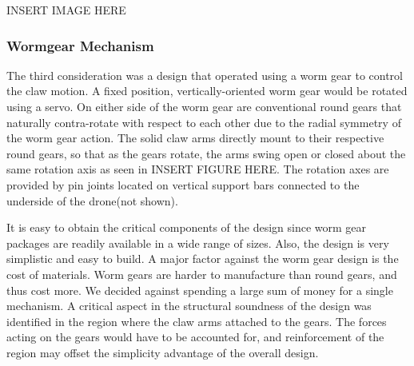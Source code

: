 			INSERT IMAGE HERE

		\subsubsection{Wormgear Mechanism}
			The third consideration was a design that operated using a worm gear to control the claw motion. A fixed position, vertically-oriented worm gear would be rotated using a servo. On either side of the worm gear are conventional round gears that naturally contra-rotate with respect to each other due to the radial symmetry of the worm gear action. The solid claw arms directly mount to their respective round gears, so that as the gears rotate, the arms swing open or closed about the same rotation axis as seen in INSERT FIGURE HERE. The rotation axes are provided by pin joints located on vertical support bars connected to the underside of the drone(not shown).

			It is easy to obtain the critical components of the design since worm gear packages are readily available in a wide range of sizes. Also, the design is very simplistic and easy to build. A major factor against the worm gear design is the cost of materials. Worm gears are harder to manufacture than round gears, and thus cost more. We decided against spending a large sum of money for a single mechanism. A critical aspect in the structural soundness of the design was identified in the region where the claw arms attached to the gears. The forces acting on the gears would have to be accounted for, and reinforcement of the region may offset the simplicity advantage of the overall design.
			
